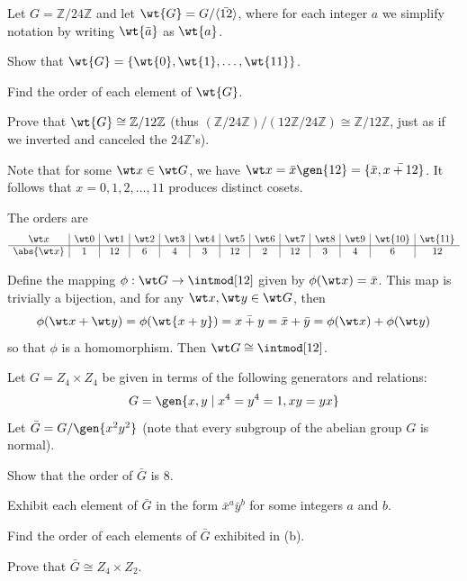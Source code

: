 \begin{specialexercise}\label{ex3.1.20}
    Let $G = \mathbb{Z}/24\mathbb{Z}$ and let $\wt{G} = G/\langle \bar{12} \rangle$, where for each integer $a$ we simplify notation by writing $\wt{\bar a}$ as $\wt{a}$.
    \begin{subproblems}
        \item Show that $\wt{G} = \{ \wt{0}, \wt{1}, \ldots, \wt{11} \}$.
        \item Find the order of each element of $\wt{G}$.
        \item Prove that $\wt{G} \cong \mathbb{Z}/12\mathbb{Z}$ (thus $(\mathbb{Z}/24\mathbb{Z})/(12\mathbb{Z}/24\mathbb{Z}) \cong \mathbb{Z}/12\mathbb{Z}$, just as if we inverted and canceled the $24\mathbb{Z}$'s).
    \end{subproblems}
\end{specialexercise}

\begin{solalph}
    \item Note that for some $\wt x \in \wt G$, we have $\wt x = \bar x\gen{12} = \{\bar x, \bar{x + 12}\}$. It follows that $x = 0, 1, 2, \dots, 11$ produces distinct cosets.
    \item The orders are
    \[
    \begin{array}{c|c|c|c|c|c|c|c|c|c|c|c|c}
        \wt x & \wt 0 & \wt 1 & \wt 2 & \wt 3 & \wt 4 & \wt 5 & \wt 6 & \wt 7 & \wt 8 & \wt 9 & \wt{10} & \wt{11} \\
        \hline
        \abs{\wt x} & 1 & 12 & 6 & 4 & 3 & 12 & 2 & 12 & 3 & 4 & 6 & 12
    \end{array}
    \]
    \item Define the mapping $\phi : \wt G \to \intmod[12]$ given by $\phi(\wt x) = \bar x$. This map is trivially a bijection, and for any $\wt x, \wt y \in \wt G$, then
    \[\phi(\wt x + \wt y) = \phi(\wt{x + y}) = \bar{x + y} = \bar x + \bar y = \phi(\wt x) + \phi(\wt y)\]
    so that $\phi$ is a homomorphism. Then $\wt G \cong \intmod[12]$.
\end{solalph}

\begin{exercise}\label{ex3.1.21}
    Let $G = Z_4 \times Z_4$ be given in terms of the following generators and relations:
    \[G = \gen{x, y \mid x^4 = y^4 = 1, xy = yx}\]
    Let $\bar G = G/\gen{x^2y^2}$ (note that every subgroup of the abelian group $G$ is normal).
    \begin{subproblems}
        \item Show that the order of $\bar G$ is 8.
        \item Exhibit each element of $\bar G$ in the form $\bar x^a \bar y^b$ for some integers $a$ and $b$.
        \item Find the order of each elements of $\bar G$ exhibited in (b).
        \item Prove that $\bar G \cong Z_4 \times Z_2$.
    \end{subproblems}
\end{exercise}

